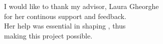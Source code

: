 \vspace*{7cm}
\begin{center}
I would like to thank my advisor, Laura Gheorghe\\
for her continous support and feedback.\\
Her help was essential in shaping \project, thus \\
making this project possible.
\end{center}
